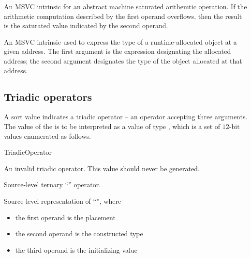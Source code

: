 An MSVC intrinsic for an abstract machine saturated arithemtic operation. 
If the arithmetic computation described by the first operand overflows, 
then the result is the saturated value indicated by the second operand.

An MSVC intrinsic used to express the type of a runtime-allocated object at a given address.
The first argument is the expression designating the allocated address; the second argument designates the type of the object allocated at that address.

\subsection{Triadic operators}
\label{sec:ifc:OperatorSort:Triadic}

A sort value  indicates a triadic operator -- 
an operator accepting three arguments.  The
value of the  is to be interpreted as a value of type 
, which is a set of $12$-bit values enumerated as follows.
%
\begin{Enumeration}{TriadicOperator}

	\setcounter{enumi}{1023}
	\setcounter{enumi}{4063}
\end{Enumeration}

An invalid triadic operator.  This value should never be generated.

Source-level ternary ``'' operator.

Source-level representation of ``'', where
\begin{itemize}
	\item the first operand is the placement 
	\item the second operand is the constructed type 
	\item the third operand is the initializing value 
\end{itemize}



